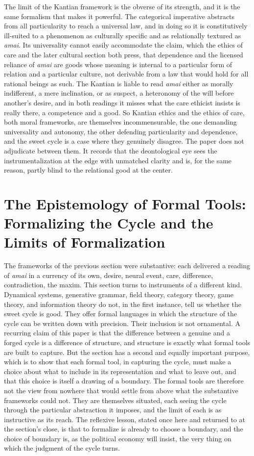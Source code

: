 \documentclass[11pt,a4paper]{article}
\begin{document}
The limit of the Kantian framework is the obverse of its strength, and it is the same formalism that makes it powerful. The categorical imperative abstracts from all particularity to reach a universal law, and in doing so it is constitutively ill-suited to a phenomenon as culturally specific and as relationally textured as \textit{amai}. Its universality cannot easily accommodate the claim, which the ethics of care and the later cultural section both press, that dependence and the licensed reliance of \textit{amai} are goods whose meaning is internal to a particular form of relation and a particular culture, not derivable from a law that would hold for all rational beings as such. The Kantian is liable to read \textit{amai} either as morally indifferent, a mere inclination, or as suspect, a heteronomy of the will before another's desire, and in both readings it misses what the care ethicist insists is really there, a competence and a good. So Kantian ethics and the ethics of care, both moral frameworks, are themselves incommensurable, the one demanding universality and autonomy, the other defending particularity and dependence, and the sweet cycle is a case where they genuinely disagree. The paper does not adjudicate between them. It records that the deontological eye sees the instrumentalization at the edge with unmatched clarity and is, for the same reason, partly blind to the relational good at the center.

\section{The Epistemology of Formal Tools: Formalizing the Cycle and the Limits of Formalization}

The frameworks of the previous section were substantive: each delivered a reading of \textit{amai} in a currency of its own, desire, neural event, care, difference, contradiction, the maxim. This section turns to instruments of a different kind. Dynamical systems, generative grammar, field theory, category theory, game theory, and information theory do not, in the first instance, tell us whether the sweet cycle is good. They offer formal languages in which the structure of the cycle can be written down with precision. Their inclusion is not ornamental. A recurring claim of this paper is that the difference between a genuine and a forged cycle is a difference of structure, and structure is exactly what formal tools are built to capture. But the section has a second and equally important purpose, which is to show that each formal tool, in capturing the cycle, must make a choice about what to include in its representation and what to leave out, and that this choice is itself a drawing of a boundary. The formal tools are therefore not the view from nowhere that would settle from above what the substantive frameworks could not. They are themselves situated, each seeing the cycle through the particular abstraction it imposes, and the limit of each is as instructive as its reach. The reflexive lesson, stated once here and returned to at the section's close, is that to formalize is already to choose a boundary, and the choice of boundary is, as the political economy will insist, the very thing on which the judgment of the cycle turns.
\end{document}
